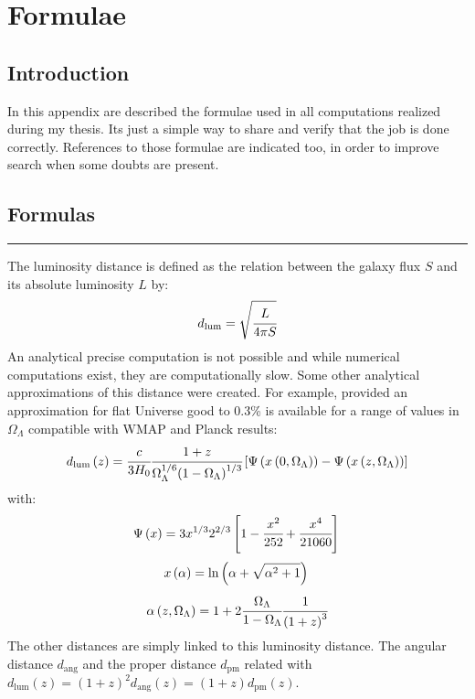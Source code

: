 \chapter{Formulae}
\label{cha:formulas}

\section{Introduction}

In this appendix are described the formulae used in all computations realized
during my thesis. Its just a simple way to share and verify that the job is
done correctly. References to those formulae are indicated too, in order to
improve search when some doubts are present.

\section{Formulas}

\noindent\rule{\linewidth}{1pt}
%
The luminosity distance is defined as the relation between the galaxy flux $S$
and its absolute luminosity $L$ by:
%
\begin{equation}
	d_{\mathrm{lum}}=\sqrt{\cfrac{L}{4\pi{S}}}
\end{equation}
%
An analytical precise computation is not possible and while numerical
computations exist, they are computationally slow. Some other analytical
approximations of this distance were created. For example, \citet{WU+10}
provided an approximation for flat Universe good to 0.3\% is available for a
range of values in $\Omega_\Lambda$ compatible with WMAP and Planck results:
%
\begin{equation}
	d_{\mathrm{lum}}\left({z}\right) = \cfrac{c}{3H_0}
    \cfrac{1+z}{\Omega_\Lambda^{1/6}
    {\left({1-\Omega_\Lambda}\right)}^{1/3}}\left[\Psi\left({x\left({0,\Omega_\Lambda}\right)}\right)-\Psi\left({x\left({z,\Omega_\Lambda}\right)}\right)\right]
\end{equation}
%
with:
%
\begin{equation}
	\Psi\left({x}\right)=3x^{1/3}{2^{2/3}}\left[1-\cfrac{x^2}{252}+\cfrac{x^4}{21060}\right]\\
\end{equation}
%
\begin{equation}
	x\left({\alpha}\right)=\ln\left({\alpha+\sqrt{\alpha^2+1}}\right)\\
\end{equation}
%
\begin{equation}
	\alpha\left({z,\Omega_\Lambda}\right) = 1+2\cfrac{\Omega_\Lambda}
    {1-\Omega_\Lambda}\cfrac{1}{{\left(1+z\right)}^3}
\end{equation}
%
The other distances are simply linked to this luminosity distance. The angular
distance $d_{\mathrm{ang}}$ and the proper distance $d_{\mathrm{pm}}$ related
with
$d_{\mathrm{lum}}(z)={(1+z)}^2d_{\mathrm{ang}}(z)=(1+z)d_{\mathrm{pm}}(z)$.

